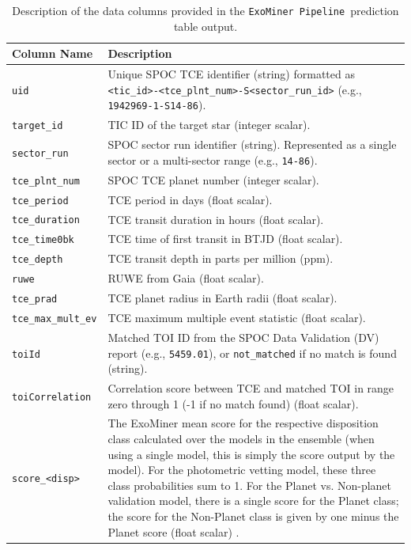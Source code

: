 \documentclass{article}
\newcommand{\ExoMinerPipeline}{\texttt{ExoMiner Pipeline}}
\begin{document}
\begin{table}[htbp]
    \centering
    \caption{Description of the data columns provided in the \ExoMinerPipeline\ prediction table output.}
    \label{tab:data_columns}
    \renewcommand{\arraystretch}{1.4} 
    \begin{tabularx}{\textwidth}{@{} l X @{}}
        \toprule
        \textbf{Column Name} & \textbf{Description} \\
        \midrule
        \texttt{uid} & Unique SPOC TCE identifier (string) formatted as \texttt{<tic\_id>-}\allowbreak\texttt{<tce\_plnt\_num>-}\allowbreak\texttt{S<sector\_run\_id>} (e.g., \texttt{1942969-1-S14-86}). \\
        \texttt{target\_id} & TIC ID of the target star (integer scalar). \\
        \texttt{sector\_run} & SPOC sector run identifier (string). Represented as a single sector or a multi-sector range (e.g., \texttt{14-86}). \\
        \texttt{tce\_plnt\_num} & SPOC TCE planet number (integer scalar). \\
        \texttt{tce\_period} & TCE period in days (float scalar). \\
        \texttt{tce\_duration} & TCE transit duration in hours (float scalar). \\
        \texttt{tce\_time0bk} & TCE time of first transit in BTJD (float scalar). \\
        \texttt{tce\_depth} & TCE transit depth in parts per million (ppm). \\
        \texttt{ruwe} & RUWE from Gaia (float scalar). \\
        \texttt{tce\_prad} & TCE planet radius in Earth radii (float scalar). \\
        \texttt{tce\_max\_mult\_ev} & TCE maximum multiple event statistic (float scalar). \\
        \texttt{toiId} & Matched TOI ID from the SPOC Data Validation (DV) report (e.g., \texttt{5459.01}), or \texttt{not\_matched} if no match is found (string). \\
        \texttt{toiCorrelation} & Correlation score between TCE and matched TOI in range zero through 1 (-1 if no match found) (float scalar). \\
        \texttt{score\_<disp>} & The ExoMiner mean score for the respective disposition class calculated over the models in the ensemble (when using a single model, this is simply the score output by the model). For the photometric vetting model, these three class probabilities sum to 1. For the Planet vs. Non-planet validation model, there is a single score for the Planet class; the score for the Non-Planet class is given by one minus the Planet score (float scalar) . \\

\end{tabularx}
\end{table}
\end{document}
